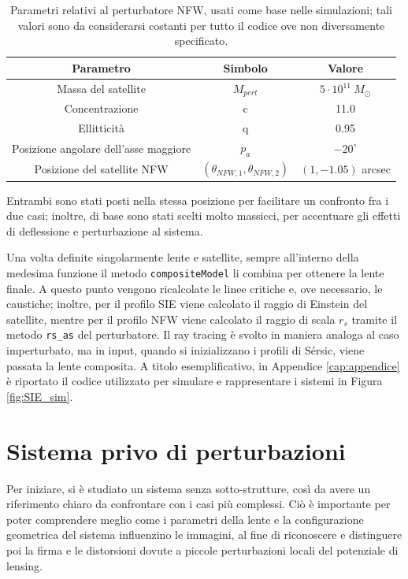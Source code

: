 \begin{table}[]
\centering
\begin{tabular}{|c|c|c|}
\hline
\textbf{Parametro}                    & \textbf{Simbolo}                     & \textbf{Valore}            \\ \hline
Massa del satellite                   & $M_{pert}$                           & $5 \cdot 10^{11}\ M_\odot$ \\ \hline
Concentrazione                        & c                                    & 11.0                       \\ \hline
Ellitticità                           & q                                    & 0.95                       \\ \hline
Posizione angolare dell'asse maggiore & $p_a$                                & $-20^\circ$                \\ \hline
Posizione del satellite NFW           & $(\theta_{NFW, 1}, \theta_{NFW, 2})$ & $(1,-1.05)$ arcsec         \\ \hline
\end{tabular}
\caption{Parametri relativi al perturbatore NFW, usati come base nelle simulazioni; tali valori sono da considerarsi costanti per tutto il codice ove non diversamente specificato.}
\label{tab:NFW_par_sim}
\end{table}

Entrambi sono stati posti nella stessa posizione per facilitare un confronto fra i due casi; inoltre, di base sono stati scelti molto massicci, per accentuare gli effetti di deflessione e perturbazione al sistema.

Una volta definite singolarmente lente e satellite, sempre all'interno della medesima funzione il metodo \texttt{compositeModel}
li combina per ottenere la lente finale. A questo punto vengono ricalcolate le linee critiche e, ove necessario, le caustiche; inoltre, per il profilo SIE viene calcolato il raggio di Einstein del satellite, mentre per il profilo NFW viene calcolato il raggio di scala $r_s$ tramite il metodo \texttt{rs\_as} del perturbatore. 
Il ray tracing è svolto in maniera analoga al caso imperturbato, ma in input, quando si inizializzano i profili di Sérsic, viene passata la lente composita.
A titolo esemplificativo, in Appendice \ref{cap:appendice} è riportato il codice utilizzato per simulare e rappresentare i sistemi in Figura \ref{fig:SIE_sim}.
\section{Sistema privo di perturbazioni}
Per iniziare, si è studiato un sistema senza sotto-strutture, così da avere un riferimento chiaro da confrontare con i casi più complessi. Ciò è importante per poter comprendere meglio come i parametri della lente e la configurazione geometrica del sistema influenzino le immagini, al fine di riconoscere e distinguere poi la firma e le distorsioni dovute a piccole perturbazioni locali del potenziale di lensing.

